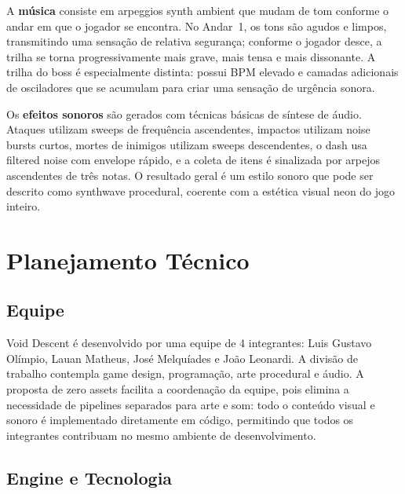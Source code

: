 \documentclass[12pt, a4paper]{article}
\begin{document}
A \textbf{m\'usica} consiste em arpeggios synth ambient que mudam de tom conforme o andar em que o jogador se encontra. No Andar~1, os tons s\~ao agudos e limpos, transmitindo uma sensa\c{c}\~ao de relativa seguran\c{c}a; conforme o jogador desce, a trilha se torna progressivamente mais grave, mais tensa e mais dissonante. A trilha do boss \'e especialmente distinta: possui BPM elevado e camadas adicionais de osciladores que se acumulam para criar uma sensa\c{c}\~ao de urg\^encia sonora.

Os \textbf{efeitos sonoros} s\~ao gerados com t\'ecnicas b\'asicas de s\'intese de \'audio. Ataques utilizam sweeps de frequ\^encia ascendentes, impactos utilizam noise bursts curtos, mortes de inimigos utilizam sweeps descendentes, o dash usa filtered noise com envelope r\'apido, e a coleta de itens \'e sinalizada por arpejos ascendentes de tr\^es notas. O resultado geral \'e um estilo sonoro que pode ser descrito como synthwave procedural, coerente com a est\'etica visual neon do jogo inteiro.

\newpage
\section{Planejamento T\'ecnico}

\subsection{Equipe}

Void Descent \'e desenvolvido por uma equipe de 4 integrantes: Luis Gustavo Ol\'impio, Lauan Matheus, Jos\'e Melqu\'iades e Jo\~ao Leonardi. A divis\~ao de trabalho contempla game design, programa\c{c}\~ao, arte procedural e \'audio. A proposta de zero assets facilita a coordena\c{c}\~ao da equipe, pois elimina a necessidade de pipelines separados para arte e som: todo o conte\'udo visual e sonoro \'e implementado diretamente em c\'odigo, permitindo que todos os integrantes contribuam no mesmo ambiente de desenvolvimento.

\subsection{Engine e Tecnologia}
\end{document}
